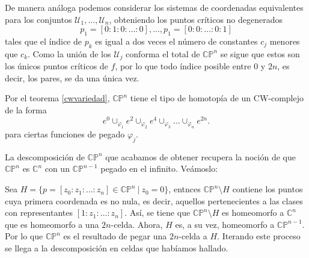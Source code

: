De manera análoga podemos considerar los sistemas de coordenadas equivalentes para los conjuntos $\mathcal{U}_1, \dots, \mathcal{U}_n$, obteniendo los puntos críticos no degenerados
\begin{equation*}
    p_1 = [0:1:0:\dots:0], \dots, p_1 = [0:0:\dots:0:1]
\end{equation*}
tales que el índice de $p_k$ es igual a dos veces el número de constantes $c_j$ menores que $c_k$. Como la unión de los $\mathcal{U}_j$ conforma el total de $\mathbb{CP}^n$ se sigue que estos son los únicos puntos críticos de $f$, por lo que todo índice posible entre $0$ y $2n$, es decir, los pares, se da una única vez.

Por el teorema \ref{cwvariedad}, $\mathbb{CP}^n$ tiene el tipo de homotopía de un CW-complejo de la forma
\begin{equation*}
    e^0\cup_{\varphi_1} e^2 \cup_{\varphi_2} e^4 \cup_{\varphi_3} \dots \cup_{\varphi_n} e^{2n}.
\end{equation*}
para ciertas funciones de pegado $\varphi_j$. 

\begin{remark}
    La descomposición de $\mathbb{CP}^n$ que acabamos de obtener recupera la noción de que $\mathbb{CP}^n$ es $\mathbb{C}^{n}$ con un $\mathbb{CP}^{n-1}$ pegado en el infinito. Veámoslo:

    Sea $H=\{p=[z_0:z_1:\dots:z_n]\in \mathbb{CP}^n ~|~ z_0=0\}$, entnces $\mathbb{CP}^n\setminus H$ contiene los puntos cuya primera coordenada es no nula, es decir, aquellos pertenecientes a las clases con representantes $[1:z_1:\dots:z_n]$. Así, se tiene que $\mathbb{CP}^n\setminus H$ es homeomorfo a $\mathbb{C}^n$ que es homeomorfo a una $2n$-celda. Ahora, $H$ es, a su vez, homeomorfo a $\mathbb{CP}^{n-1}$. Por lo que $\mathbb{CP}^n$ es el resultado de pegar una $2n$-celda a $H$. Iterando este proceso se llega a la descomposición en celdas que habíamos hallado.
\end{remark}